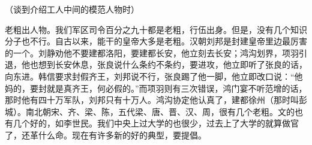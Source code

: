（谈到介绍工人中间的模范人物时）

老粗出人物。我们军区司令百分之九十都是老粗，行伍出身。但是，没有几个知识分子也不行。自古以来，能干的皇帝大多是老粗。汉朝刘邦是封建皇帝里边最厉害的一个。刘静劝他不要建都洛阳，要建都长安，他立刻去长安；鸿沟划界，项羽引退，他也想到长安休息，张良说什么条约不条约，要进攻，他立即听了张良的话，向东进。韩信要求封假齐王，刘邦说不行，张良踢了他一脚，他立即改口说：“他妈的，要封就是真齐王，何必假的。”而项羽则有三次错误，鸿门宴不听范增的话，那时他有四十万军队，刘邦只有十万人。鸿沟协定他认真了，建都徐州（那时叫彭城）。南北朝宋、齐、梁、陈，五代梁、唐、晋、汉、周，很有几个老粗。文的也有几个好的，如李世民。我们中央上过大学的也很少，过去上了大学的就算做官了，还革什么命。现在有许多新的好的典型，要提倡。



